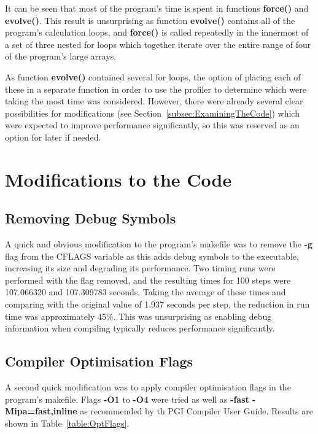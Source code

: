 \documentclass[11pt, oneside]{article}   %
\begin{document}
It can be seen that most of the program's time is spent in functions \textbf{force()} and \textbf{evolve()}.
This result is unsurprising as function \textbf{evolve()} contains all of the program's calculation loops, and \textbf{force()} is called repeatedly in the innermost of a set of three nested for loops which together iterate over the entire range of four of the program's large arrays.

As function \textbf{evolve()} contained several for loops, the option of placing each of these in a separate function in order to use the profiler to determine which were taking the most time was considered.
However, there were already several clear possibilities for modifications (see Section~\ref{subsec:ExaminingTheCode}) which were expected to improve performance significantly, so this was reserved as an option for later if needed.

\section{Modifications to the Code}

\subsection{Removing Debug Symbols}
A quick and obvious modification to the program's makefile was to remove the \textbf{-g} flag from the CFLAGS variable as this adds debug symbols to the executable, increasing its size and degrading its performance.
Two timing runs were performed with the flag removed, and the resulting times for 100 steps were 107.066320 and 107.309783 seconds.
Taking the average of these times and comparing with the original value of 1.937 seconds per step, the reduction in run time was approximately 45\%.
This was unsurprising as enabling debug information when compiling typically reduces performance significantly.

\subsection{Compiler Optimisation Flags}
A second quick modification was to apply compiler optimisation flags in the program's makefile.
Flags \textbf{-O1} to \textbf{-O4} were tried as well as \textbf{-fast -Mipa=fast,inline}  as recommended by th PGI Compiler User Guide. \cite{ref:PgiCC}
Results are shown in Table~\ref{table:OptFlags}.
\end{document}
